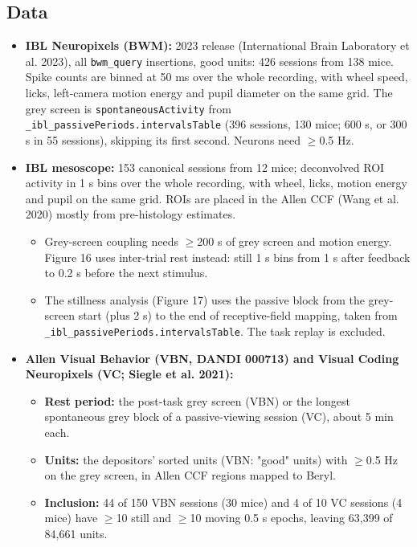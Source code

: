 \documentclass[10pt,a4paper]{article}
\begin{document}
\subsection{Data}
\begin{itemize}
\item \textbf{IBL Neuropixels (BWM):} 2023 release (International Brain Laboratory et al. 2023), all \texttt{bwm\_\allowbreak{}query} insertions, good units: 426 sessions from 138 mice. Spike counts are binned at 50 ms over the whole recording, with wheel speed, licks, left-camera motion energy and pupil diameter on the same grid. The grey screen is \texttt{spontaneousActivity} from \texttt{\_\allowbreak{}ibl\_\allowbreak{}passivePeriods.intervalsTable} (396 sessions, 130 mice; 600 s, or 300 s in 55 sessions), skipping its first second. Neurons need $\geq$0.5 Hz.
\item \textbf{IBL mesoscope:} 153 canonical sessions from 12 mice; deconvolved ROI activity in 1 s bins over the whole recording, with wheel, licks, motion energy and pupil on the same grid. ROIs are placed in the Allen CCF (Wang et al. 2020) mostly from pre-histology estimates. 
\begin{itemize}
\item Grey-screen coupling needs $\geq$200 s of grey screen and motion energy. Figure 16 uses inter-trial rest instead: still 1 s bins from 1 s after feedback to 0.2 s before the next stimulus.
\item The stillness analysis (Figure 17) uses the passive block from the grey-screen start (plus 2 s) to the end of receptive-field mapping, taken from \texttt{\_\allowbreak{}ibl\_\allowbreak{}passivePeriods.intervalsTable}. The task replay is excluded.
\end{itemize}
\item \textbf{Allen Visual Behavior (VBN, DANDI 000713) and Visual Coding Neuropixels (VC; Siegle et al. 2021):} 
\begin{itemize}
\item \textbf{Rest period:} the post-task grey screen (VBN) or the longest spontaneous grey block of a passive-viewing session (VC), about 5 min each.
\item \textbf{Units:} the depositors' sorted units (VBN: "good" units) with $\geq$0.5 Hz on the grey screen, in Allen CCF regions mapped to Beryl.
\item \textbf{Inclusion:} 44 of 150 VBN sessions (30 mice) and 4 of 10 VC sessions (4 mice) have $\geq$10 still and $\geq$10 moving 0.5 s epochs, leaving 63,399 of 84,661 units.

\end{itemize}
\end{itemize}
\end{document}
